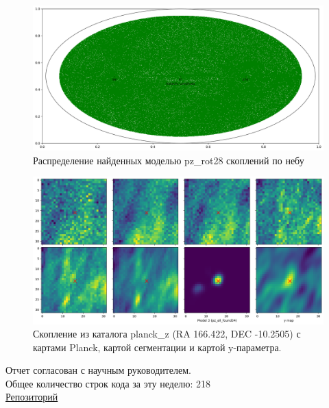 \documentclass{article}
\begin{document}
\begin{figure}[h]
\includegraphics[width=0.8\linewidth]{pz_rot28_map}
\caption{Распределение найденных моделью pz\_rot28 скоплений по небу}
\end{figure}

\begin{figure}[h]
\includegraphics[width=0.8\linewidth]{cluster_pic}
\caption{Скопление из каталога planck\_z (RA 166.422, DEC -10.2505) с картами Planck, картой 
    сегментации и картой y-параметра.}
\label{Pic:Cluster}
\end{figure}

Отчет согласован с научным руководителем.\\
Общее количество строк кода за эту неделю: 218\\
\href{https://github.com/rt2122/data-segmentation-2}{Репозиторий}\\ 
\end{document}
